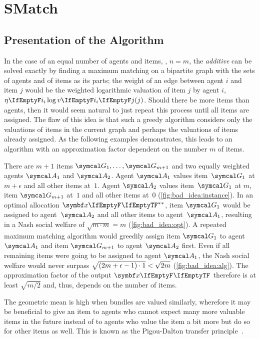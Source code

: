 \section{SMatch}
\label{sec:smatch}

\subsection{Presentation of the Algorithm}
\label{subsec:smatch:presentation}

In the case of an equal number of agents and items, \ie, \(n = m\), the \emph{additive} \NSW{} can be solved exactly by finding a maximum matching on a bipartite graph with the sets of agents and of items as its parts;
the weight of an edge between agent \(i\) and item \(j\) would be the weighted logarithmic valuation of item \(j\) by agent \(i\), \ie{} \(\weight \log \valuations[j]\).
Should there be more items than agents, then it would seem natural to just repeat this process until all items are assigned.
The flaw of this idea is that such a greedy algorithm considers only the valuations of items in the current graph and perhaps the valuations of items already assigned.
As the following examples demonstrates, this leads to an algorithm with an approximation factor dependent on the number \(m\) of items.
\begin{example}
	\label{ex:bad_idea}
	There are \(m+1\) items \(\goods_{1}, \dots, \goods_{m+1}\) and two equally weighted agents \(\agents_{1}\) and \(\agents_{2}\).
	Agent \(\agents_{1}\) values item~\(\goods_{1}\) at \(m + \epsilon\) and all other items at~\(1\).
	Agent \(\agents_{2}\) values item~\(\goods_{1}\) at \(m\), item \(\goods_{m+1}\) at~\(1\) and all other items at~\(0\) (\cref{fig:bad_idea:instance}).
	In an optimal allocation \(\alloc*[][]\), item \(\goods_{1}\) would be assigned to agent~\(\agents_{2}\) and all other items to agent~\(\agents_{1}\), resulting in a Nash social welfare of \(\sqrt{m \cdot m} = m\) (\cref{fig:bad_idea:opt}).
	A repeated maximum matching algorithm would greedily assign item \(\goods_{1}\) to agent \(\agents_{1}\) and item \(\goods_{m+1}\) to agent \(\agents_{2}\) first.
	Even if all remaining items were going to be assigned to agent \(\agents_{1}\), the Nash social welfare would never surpass \(\smash{\sqrt{(2m + \epsilon - 1) \cdot 1}} < \sqrt{2m}\) (\cref{fig:bad_idea:alg}).
	The approximation factor of the output \(\alloc[][]\) therefore is at least \(\sqrt{m/2}\) and, thus, depends on the number of items.
\end{example}
The geometric mean is high when bundles are valued similarly, wherefore it may be beneficial to give an item to agents who cannot expect many more valuable items in the future instead of to agents who value the item a bit more but do so for other items as well.
This is known as the Pigou-Dalton transfer principle~\cite{sublin_approx_algo_for_nsw_with_xos_valuations}.

